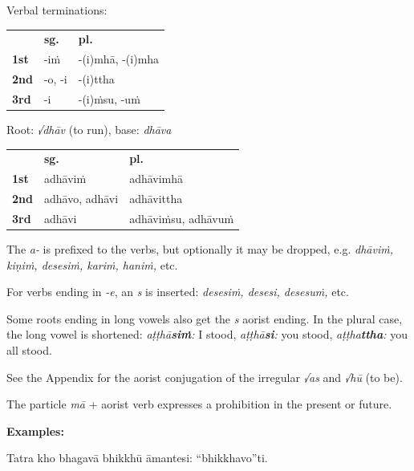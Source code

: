 \documentclass[11pt,oneside]{memoir}
\begin{document}
{\centering\par
\begin{multicols}{2}

Verbal terminations:

\begin{center}
\begin{tabular}{lll}
 & \textbf{sg.} & \textbf{pl.}\\
\textbf{1st} & -iṁ & -(i)mhā, -(i)mha\\
\textbf{2nd} & -o, -i & -(i)ttha\\
\textbf{3rd} & -i & -(i)ṁsu, -uṁ\\
\end{tabular}
\end{center}

\columnbreak

Root: \emph{√dhāv} (to run), base: \emph{dhāva}

\begin{center}
\begin{tabular}{lll}
 & \textbf{sg.} & \textbf{pl.}\\
\textbf{1st} & adhāviṁ & adhāvimhā\\
\textbf{2nd} & adhāvo, adhāvi & adhāvittha\\
\textbf{3rd} & adhāvi & adhāviṁsu, adhāvuṁ\\
\end{tabular}
\end{center}

\end{multicols}
\par}

The \emph{a-} is prefixed to the verbs, but optionally it may be dropped, e.g.
\emph{dhāviṁ, kiṇiṁ, desesiṁ, kariṁ, haniṁ,} etc.

For verbs ending in \emph{-e}, an \emph{s} is inserted: \emph{desesiṁ, desesi, desesuṁ,} etc.

Some roots ending in long vowels also get the \emph{s} aorist ending. In the plural case, the long vowel is shortened:
\emph{aṭṭhā\textbf{siṁ}:} I stood, \emph{aṭṭhā\textbf{si}:} you stood, \emph{aṭṭha\textbf{ttha}:} you all stood.

See the Appendix for the aorist conjugation of the irregular \emph{√as} and \emph{√hū} (to be).

The particle \emph{mā} + aorist verb expresses a prohibition in the present or future.

\textbf{Examples:}

Tatra kho bhagavā bhikkhū āmantesi: “bhikkhavo”ti.
\end{document}
